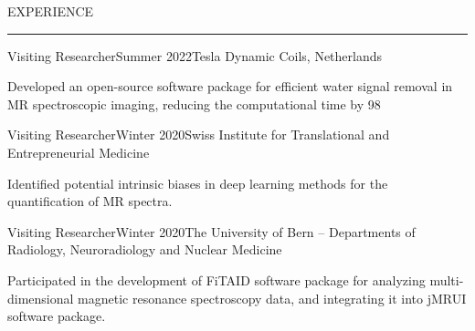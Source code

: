 \documentclass{resume} %
\renewenvironment{rSection}[1]{
\sectionskip
\textcolor{RoyalPurple}{\MakeUppercase{#1}}
\sectionlineskip
\hrule
\begin{list}{}{
\setlength{\leftmargin}{1.5em}
}
\item[]
}{
\end{list}
}
\begin{document}
\begin{rSection}{EXPERIENCE}
\begin{rSubsection}{Visiting Researcher}{Summer 2022}{Tesla Dynamic Coils, Netherlands}{}
\item Developed an open-source software package for efficient water signal removal in MR spectroscopic imaging, reducing the computational time by 98%
\end{rSubsection}

\begin{rSubsection}{Visiting Researcher}{Winter 2020}{Swiss Institute for Translational and Entrepreneurial Medicine}{}
\item Identified potential intrinsic biases in deep learning methods for the quantification of MR spectra.
\end{rSubsection}

\begin{rSubsection}{Visiting Researcher}{Winter 2020}{The University of Bern – Departments of Radiology, Neuroradiology and Nuclear Medicine}{}
\item Participated in the development of FiTAID software package for analyzing multi-dimensional magnetic resonance spectroscopy data, and integrating it into jMRUI software package.
\end{rSubsection}






\end{rSection}
\end{document}
